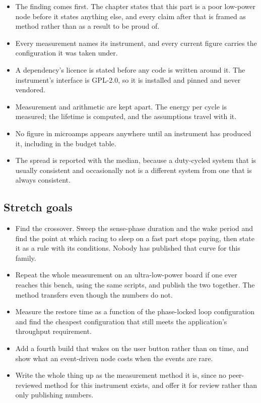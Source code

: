 \begin{itemize}
\item The finding comes first. The chapter states that this part is a poor
low-power node before it states anything else, and every claim after that is
framed as method rather than as a result to be proud of.
\item Every measurement names its instrument, and every current figure carries
the configuration it was taken under.
\item A dependency's licence is stated before any code is written around it.
The instrument's interface is GPL-2.0, so it is installed and pinned and never
vendored.
\item Measurement and arithmetic are kept apart. The energy per cycle is
measured; the lifetime is computed, and the assumptions travel with it.
\item No figure in microamps appears anywhere until an instrument has produced
it, including in the budget table.
\item The spread is reported with the median, because a duty-cycled system that
is usually consistent and occasionally not is a different system from one that
is always consistent.
\end{itemize}

\subsection*{Stretch goals}

\begin{itemize}
\item Find the crossover. Sweep the sense-phase duration and the wake period and
find the point at which racing to sleep on a fast part stops paying, then state
it as a rule with its conditions. Nobody has published that curve for this
family.
\item Repeat the whole measurement on an ultra-low-power board if one ever
reaches this bench, using the same scripts, and publish the two together. The
method transfers even though the numbers do not.
\item Measure the restore time as a function of the phase-locked loop
configuration and find the cheapest configuration that still meets the
application's throughput requirement.
\item Add a fourth build that wakes on the user button rather than on time, and
show what an event-driven node costs when the events are rare.
\item Write the whole thing up as the measurement method it is, since no
peer-reviewed method for this instrument exists, and offer it for review rather
than only publishing numbers.
\end{itemize}


